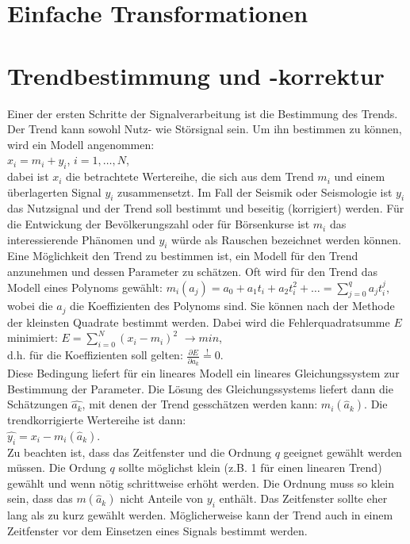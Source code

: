 \section{Einfache Transformationen}
\section{Trendbestimmung und -korrektur}
Einer der ersten Schritte der Signalverarbeitung ist die Bestimmung des Trends. Der Trend kann sowohl Nutz- wie Störsignal sein. Um ihn bestimmen zu können, wird ein Modell angenommen:\\
$x_i=m_i + y_i$, $i=1,\dots, N$, \\
 dabei ist $x_i$ die betrachtete Wertereihe, die sich aus dem Trend $m_i$ und einem überlagerten Signal $y_i$ zusammensetzt. Im Fall der Seismik oder Seismologie ist ${y_i}$ das Nutzsignal und der Trend soll bestimmt und beseitig (korrigiert) werden. Für die Entwickung der Bevölkerungszahl oder für Börsenkurse ist ${m_i}$ das interessierende Phänomen und ${y_i}$ würde als Rauschen bezeichnet werden können. \\
Eine Möglichkeit den Trend zu bestimmen ist, ein Modell für den Trend anzunehmen und dessen Parameter zu schätzen. Oft wird für den Trend das Modell eines Polynoms gewählt:
$m_i(a_j)=a_0+ a_1t_i+a_2t_i^2+\dots = \sum\limits_{j=0}^{q} a_j t_i^j$,\\
wobei die ${a_j}$ die Koeffizienten des Polynoms sind. Sie können nach der Methode der kleinsten Quadrate bestimmt werden. Dabei wird die Fehlerquadratsumme $E$ minimiert:
$E=\sum\limits_{i=0}^N (x_i -m_i)^2$ $\rightarrow min$,\\
d.h. für die Koeffizienten soll gelten:
$\frac{\partial E}{\partial a_k}\stackrel{!}{=}0$.\\
Diese Bedingung liefert für ein lineares Modell ein lineares Gleichungssystem zur Bestimmung der Parameter. Die Lösung des Gleichungssystems liefert dann die Schätzungen $\hat{a_k}$, mit denen der Trend gesschätzen werden kann: $m_i(\hat a_k)$. Die trendkorrigierte Wertereihe ist dann:\\
$\hat {y_i}=x_i-m_i(\hat a_k)$.\\
Zu beachten ist, dass das Zeitfenster und die Ordnung $q$ geeignet gewählt werden müssen. Die Ordung $q$ sollte möglichst klein (z.B. 1 für einen linearen Trend) gewählt und wenn nötig schrittweise erhöht werden. Die Ordnung muss so klein sein, dass das $m(\hat a_k)$ nicht Anteile von ${y_i}$ enthält. Das Zeitfenster sollte eher lang als zu kurz gewählt werden. Möglicherweise kann der Trend auch in einem Zeitfenster vor dem Einsetzen eines Signals bestimmt werden.\\
 
